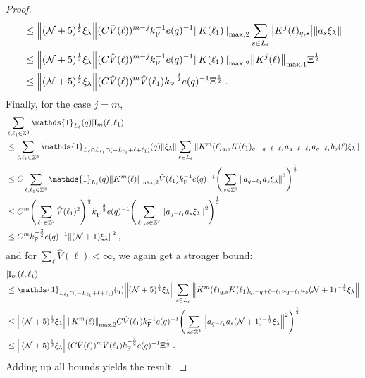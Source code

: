 \documentclass[12pt,a4paper]{article}
\numberwithin{equation}{section}
\newcommand{\1}{\mathbb{I}}
\newcommand{\F}{\mathrm{F}}
\newcommand{\I}{\mathrm{I}}
\newcommand{\Zstar}{\mathbb{Z}^3} %
\newcommand{\Z}{\mathbb{Z}}
\newcommand{\NN}{\mathcal{N}}
\newcommand{\half}{\frac{1}{2}}
\theoremstyle{plain}
\theoremstyle{definition}
\theoremstyle{remark}
\theoremstyle{plain}
\theoremstyle{definition}
\theoremstyle{remark}
\begin{document}
\begin{proof}
\begin{align}
	&\leq \norm{ (\NN+5)^{\half} \xi_\lambda}
		(C \hat{V}(\ell))^{m-j} k_{\F}^{-1} e(q)^{-1}
		\norm{K(\ell_1)}_{\max,2}
		\sum_{s\in L_{\ell}}\abs{K^{j}(\ell)_{q,s}}
		\norm{a_s \xi_\lambda }		
	\nonumber\\
	&\leq \norm{(\NN+5)^\half \xi_\lambda }
		(C \hat{V}(\ell))^{m-j} k_{\F}^{-1} e(q)^{-1}
		\norm{ K(\ell_1) }_{\max,2}
		\norm{ K^{j}(\ell)}_{\mathrm{max,1}} \Xi^\half \nonumber \\
	&\leq \norm{(\NN+5)^\half \xi_\lambda }
		(C \hat{V}(\ell))^m
		\hat{V}(\ell_1)
		k_{\F}^{-\frac 32} e(q)^{-1} \Xi^\half \;.
\end{align}
Finally, for the case $ j = m $,
\begin{align}
	&\sum_{\ell,\ell_1 \in \Zstar} \mathds{1}_{L_\ell}(q) |\I_m(\ell, \ell_1)| \nonumber\\
	&\leq \sum_{\ell,\ell_1 \in \Zstar} \mathds{1}_{L_\ell \cap L_{\ell_1} \cap (-L_{\ell_1} + \ell + \ell_1)}(q) \norm{\xi_\lambda}
		\sum\limits_{s \in L_{\ell}}
		\norm{ K^m(\ell)_{q,s} K(\ell_1)_{q,-q+\ell+\ell_1} a_{q-\ell-\ell_1} a_{q-\ell_1} b_{s}(\ell) \xi_\lambda } \nonumber\\
	&\leq C
		\sum_{\ell,\ell_1 \in \Zstar} \mathds{1}_{L_\ell}(q)
		\norm{K^m(\ell)}_{\max,2} \hat{V}(\ell_1) k_{\F}^{-1} e(q)^{-1}
		\Bigg(\sum\limits_{s \in \Z^3} \norm{ a_{q-\ell_1} a_s \xi_\lambda }^2\Bigg)^\half \nonumber\\
	&\leq C^m
		\Bigg( \sum_{\ell_1 \in \Zstar} \hat{V}(\ell_1)^2 \Bigg)^{\half}
		k_{\F}^{-\frac 32} e(q)^{-1}
		\Bigg(\sum\limits_{\ell_1,s \in \Z^3} \norm{ a_{q-\ell_1} a_s \xi_\lambda }^2\Bigg)^\half \nonumber\\
	&\leq C^m k_{\F}^{-\frac 32} e(q)^{-1} \norm{(\NN+1) \xi_\lambda }^2 \;, \label{eq:estEQ1123_Coulomb}
\end{align}
and for $ \sum_{\ell} \hat{V}(\ell) < \infty $, we again get a stronger bound:
\begin{align}
	&|\I_m(\ell, \ell_1)| \nonumber\\
	&\leq \mathds{1}_{L_{\ell_1} \cap (-L_{\ell_1} + \ell + \ell_1)}(q) \norm{(\NN+5)^{\half} \xi_\lambda}
		\sum_{s \in L_{\ell}}
		\norm{ K^m(\ell)_{q,s} K(\ell_1)_{q,-q+\ell+\ell_1} a_{q-\ell_1} a_s (\NN+1)^{-\half} \xi_\lambda } \nonumber\\
	&\leq \norm{(\NN+5)^{\half} \xi_\lambda}
		\norm{K^m(\ell)}_{\max,2}
		C \hat{V}(\ell_1) k_{\F}^{-1} e(q)^{-1}
		\Bigg(\sum_{s \in \Z^3}  \norm{ a_{q-\ell_1} a_s (\NN+1)^{-\half} \xi_\lambda }^2\Bigg)^\half \nonumber\\
	&\leq \norm{(\NN+5)^\half \xi_\lambda }
		(C \hat{V}(\ell))^m
		\hat{V}(\ell_1)
		k_{\F}^{-\frac 32} e(q)^{-1} \Xi^\half \;. \label{eq:estEQ1123}
\end{align}
Adding up all bounds yields the result.
\end{proof}
\end{document}
